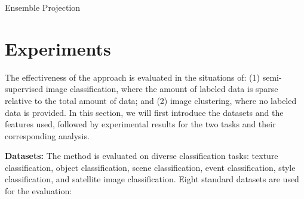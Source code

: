 \documentclass[preprint,12pt,3p]{elsarticle}
\begin{document}
 


\begin{algorithm}[!t] \small
\caption{Ensemble Projection } 
\label{alg:ensemble:projection}
\end{algorithm}


\section{Experiments}
\label{sec:experiments}

The effectiveness of the approach is evaluated in the situations of:
(1) semi-supervised image classification, where the amount of labeled
data is sparse relative to the total amount of data; and (2) image
clustering, where no labeled data is provided. In this section, we
will first introduce the datasets and the features used, followed
by experimental results for the two tasks and their corresponding analysis.


\textbf{Datasets:} The method is evaluated on diverse classification
tasks: texture classification, object classification, scene
classification, event classification, style classification, and
satellite image classification. Eight standard datasets are used for
the evaluation:
\end{document}
